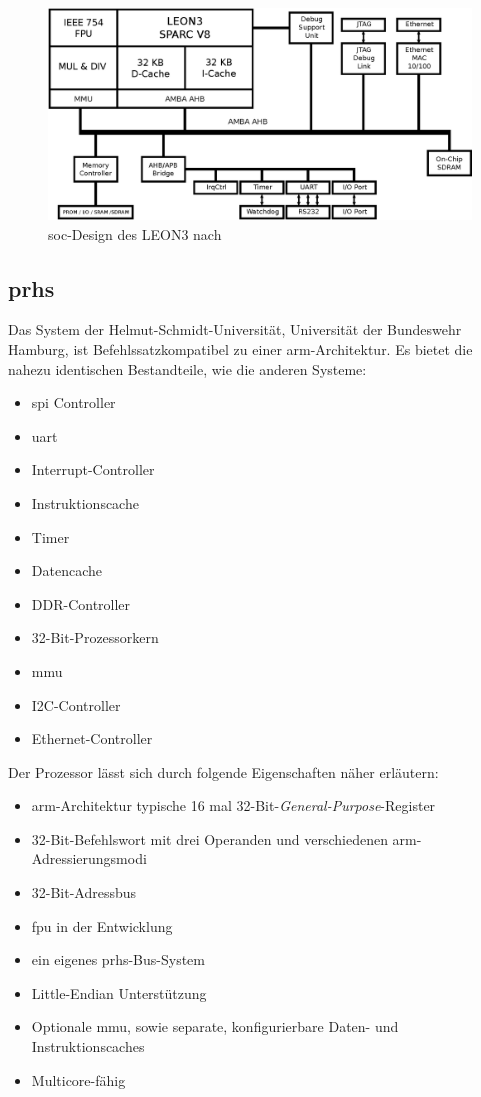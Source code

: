 \begin{figure}[H]
\centering
\includegraphics[width=1\textwidth]{Hauptteil/leon3.eps}
\caption{\ac{soc}-Design des LEON3 nach~\cite{comparison}}
\label{fig:leon}
\end{figure}

\subsection{\acl{prhs}}\label{kap:prhs}

Das System der Helmut-Schmidt-Universität, Universität der Bundeswehr Hamburg, ist Befehlssatzkompatibel zu einer \ac{arm}-Architektur. Es bietet die nahezu identischen Bestandteile, wie die
anderen Systeme:\\
\begin{itemize}
  \item \ac{spi} Controller
  \item \ac{uart}
  \item Interrupt-Controller
  \item Instruktionscache
  \item  Timer
  \item Datencache
  \item DDR-Controller
  \item 32-Bit-Prozessorkern
  \item \ac{mmu}
  \item I2C-Controller
  \item Ethernet-Controller
\end{itemize}

Der Prozessor lässt sich durch folgende Eigenschaften näher erläutern:\\
\begin{itemize}
\item \ac{arm}-Architektur typische 16 mal 32-Bit-\emph{General-Purpose}-Register
\item 32-Bit-Befehlswort mit drei Operanden und verschiedenen \ac{arm}-Adressierungsmodi
\item 32-Bit-Adressbus
\item \ac{fpu} in der Entwicklung
\item ein eigenes \ac{prhs}-Bus-System
\item Little-Endian Unterstützung
\item Optionale \ac{mmu}, sowie separate, konfigurierbare Daten- und Instruktionscaches
\item Multicore-fähig
\end{itemize}

